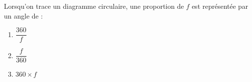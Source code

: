 
\begin{exercice}\label{exo2smath-0241}

    Lorsqu'on trace un diagramme circulaire, une proportion de \( f\) est représentée par un angle de :
    \begin{enumerate}
        \item
            \( \dfrac{ 360 }{ f }\)
        \item
            \( \dfrac{ f }{ 360 }\)
        \item
            \( 360\times f\)
    \end{enumerate}

\end{exercice}
